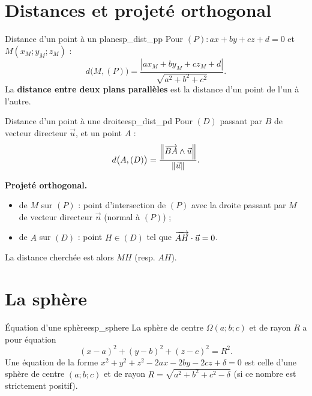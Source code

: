 \section{Distances et projeté orthogonal}

\begin{propriete}{Distance d'un point à un plan}{esp_dist_pp}
	Pour $(P) : ax + by + cz + d = 0$ et $M(x_M;y_M;z_M)$ :
	$$
	d\bigl(M,(P)\bigr) = \frac{\left|a x_M + b y_M + c z_M + d\right|}{\sqrt{a^2 + b^2 + c^2}}.
	$$
	La \textbf{distance entre deux plans parallèles} est la distance d'un point
	de l'un à l'autre.
\end{propriete}

\begin{propriete}{Distance d'un point à une droite}{esp_dist_pd}
	Pour $(D)$ passant par $B$ de vecteur directeur $\vec u$, et un point $A$ :
	$$
	d\bigl(A,(D)\bigr) = \frac{\left\|\overrightarrow{BA} \wedge \vec u\right\|}{\left\|\vec u\right\|}.
	$$
\end{propriete}

\begin{methode}
	\textbf{Projeté orthogonal.}
	\begin{itemize}[label=\textbullet]
		\item de $M$ sur $(P)$ : point d'intersection de $(P)$ avec la droite
		passant par $M$ de vecteur directeur $\vec n$ (normal à $(P)$) ;
		\item de $A$ sur $(D)$ : point $H \in (D)$ tel que $\overrightarrow{AH} \cdot \vec u = 0$.
	\end{itemize}
	La distance cherchée est alors $MH$ (resp. $AH$).
\end{methode}


\section{La sphère}

\begin{propriete}{Équation d'une sphère}{esp_sphere}
	La sphère de centre $\Omega(a;b;c)$ et de rayon $R$ a pour équation
	$$
	(x - a)^2 + (y - b)^2 + (z - c)^2 = R^2.
	$$
	Une équation de la forme
	$x^2 + y^2 + z^2 - 2a x - 2b y - 2c z + \delta = 0$ est celle d'une sphère
	de centre $(a;b;c)$ et de rayon $R = \sqrt{a^2 + b^2 + c^2 - \delta}$
	(si ce nombre est strictement positif).
\end{propriete}

